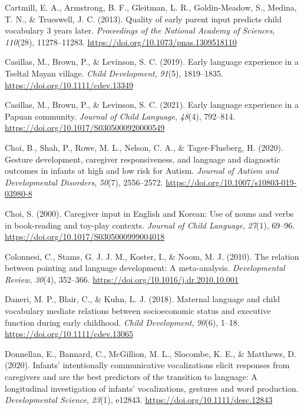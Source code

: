 \documentclass[
  english,
  man,floatsintext]{apa6}
\begin{document}
\leavevmode\hypertarget{ref-cartmill_quality_2013}{}%
Cartmill, E. A., Armstrong, B. F., Gleitman, L. R., Goldin-Meadow, S., Medina, T. N., \& Trueswell, J. C. (2013). Quality of early parent input predicts child vocabulary 3 years later. \emph{Proceedings of the National Academy of Sciences}, \emph{110}(28), 11278--11283. \url{https://doi.org/10.1073/pnas.1309518110}

\leavevmode\hypertarget{ref-casillas_early_2019}{}%
Casillas, M., Brown, P., \& Levinson, S. C. (2019). Early language experience in a Tseltal Mayan village. \emph{Child Development}, \emph{91}(5), 1819--1835. \url{https://doi.org/10.1111/cdev.13349}

\leavevmode\hypertarget{ref-casillas_early_2021}{}%
Casillas, M., Brown, P., \& Levinson, S. C. (2021). Early language experience in a Papuan community. \emph{Journal of Child Language}, \emph{48}(4), 792--814. \url{https://doi.org/10.1017/S0305000920000549}

\leavevmode\hypertarget{ref-choi_gesture_2020}{}%
Choi, B., Shah, P., Rowe, M. L., Nelson, C. A., \& Tager-Flusberg, H. (2020). Gesture development, caregiver responsiveness, and language and diagnostic outcomes in infants at high and low risk for Autism. \emph{Journal of Autism and Developmental Disorders}, \emph{50}(7), 2556--2572. \url{https://doi.org/10.1007/s10803-019-03980-8}

\leavevmode\hypertarget{ref-choi_caregiver_2000}{}%
Choi, S. (2000). Caregiver input in English and Korean: Use of nouns and verbs in book-reading and toy-play contexts. \emph{Journal of Child Language}, \emph{27}(1), 69--96. \url{https://doi.org/10.1017/S0305000999004018}

\leavevmode\hypertarget{ref-colonnesi_relation_2010}{}%
Colonnesi, C., Stams, G. J. J. M., Koster, I., \& Noom, M. J. (2010). The relation between pointing and language development: A meta-analysis. \emph{Developmental Review}, \emph{30}(4), 352--366. \url{https://doi.org/10.1016/j.dr.2010.10.001}

\leavevmode\hypertarget{ref-daneri_maternal_2018}{}%
Daneri, M. P., Blair, C., \& Kuhn, L. J. (2018). Maternal language and child vocabulary mediate relations between socioeconomic status and executive function during early childhood. \emph{Child Development}, \emph{90}(6), 1--18. \url{https://doi.org/10.1111/cdev.13065}

\leavevmode\hypertarget{ref-donnellan_infants_2020}{}%
Donnellan, E., Bannard, C., McGillion, M. L., Slocombe, K. E., \& Matthews, D. (2020). Infants' intentionally communicative vocalizations elicit responses from caregivers and are the best predictors of the transition to language: A longitudinal investigation of infants' vocalizations, gestures and word production. \emph{Developmental Science}, \emph{23}(1), e12843. \url{https://doi.org/10.1111/desc.12843}
\end{document}
